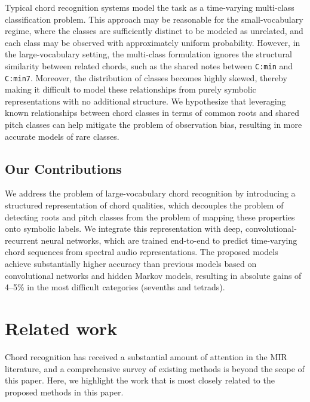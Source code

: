 \documentclass{article}
\begin{document}
Typical chord recognition systems model the task as a time-varying multi-class classification problem.
This approach may be reasonable for the small-vocabulary regime, where the classes are sufficiently distinct to be modeled as unrelated, and each class may be observed with approximately uniform probability.
However, in the large-vocabulary setting, the multi-class formulation ignores the structural similarity between related chords, such as the shared notes between \texttt{C:min} and \texttt{C:min7}.
Moreover, the distribution of classes becomes highly skewed, thereby making it difficult to model these relationships from purely symbolic representations with no additional structure.
We hypothesize that leveraging known relationships between chord classes in terms of common roots and shared pitch classes can help mitigate the problem of observation bias, resulting in more accurate models of rare classes.

\subsection{Our Contributions}

We address the problem of large-vocabulary chord recognition by introducing a structured representation of chord qualities, which decouples the problem of detecting roots and pitch classes from the problem of mapping these properties onto symbolic labels.
We integrate this representation with deep, convolutional-recurrent neural networks, which are trained end-to-end to predict time-varying chord sequences from spectral audio representations.
The proposed models achieve substantially higher accuracy than previous models based on convolutional networks and hidden Markov models, resulting in absolute gains of 4--5\% in the most difficult categories (sevenths and tetrads).

%
\section{Related work}

Chord recognition has received a substantial amount of attention in the MIR literature, and a comprehensive survey of existing methods is beyond the scope of this paper.
Here, we highlight the work that is most closely related to the proposed methods in this paper.
\end{document}
